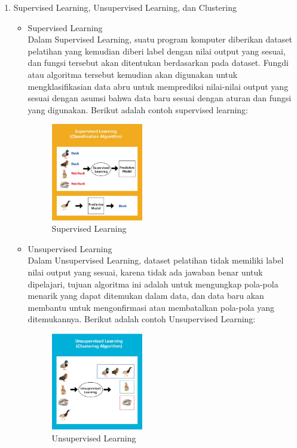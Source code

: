 \begin{enumerate}
\item Supervised Learning, Unsupervised Learning, dan Clustering
\begin{itemize}
\item Supervised Learning \\
Dalam Supervised Learning, suatu program komputer diberikan dataset pelatihan yang kemudian diberi label dengan nilai output yang sesuai, dan fungsi tersebut akan ditentukan berdasarkan pada dataset. Fungdi atau algoritma tersebut kemudian akan digunakan untuk mengklasifikasian data abru untuk memprediksi nilai-nilai output yang sesuai dengan asumsi bahwa data baru sesuai dengan aturan dan fungsi yang digunakan. Berikut adalah contoh supervised learning:
\begin{figure}[H]
		\includegraphics[width=4cm]{figures/1174054/2/supervised.jpg}
		\centering
		\caption{Supervised Learning}
\end{figure}

\item Unsupervised Learning \\
Dalam Unsupervised Learning, dataset pelatihan tidak memiliki label nilai output yang sesuai, karena tidak ada jawaban benar untuk dipelajari, tujuan algoritma ini adalah untuk mengungkap pola-pola menarik yang dapat ditemukan dalam data, dan data baru akan membantu untuk mengonfirmasi atau membatalkan pola-pola yang ditemukannya. Berikut adalah contoh Unsupervised Learning:
\begin{figure}[H]
		\includegraphics[width=4cm]{figures/1174054/2/unsupervised.jpg}
		\centering
		\caption{Unsupervised Learning}
\end{figure}


\end{itemize}
\end{enumerate}
